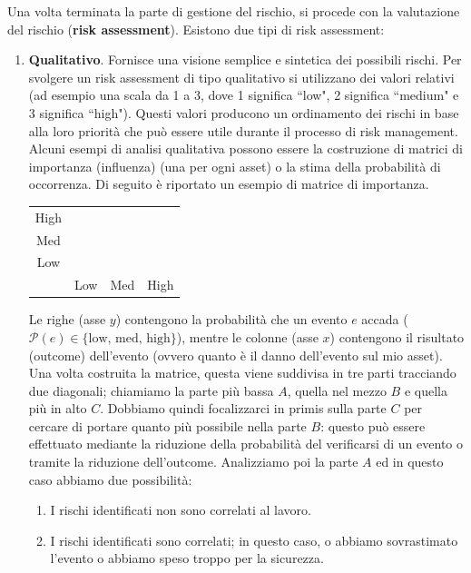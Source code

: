 Una volta terminata la parte di gestione del rischio, si procede con la valutazione del rischio (\textbf{risk assessment}). Esistono due tipi di risk assessment:
\begin{enumerate}
	\item \textbf{Qualitativo}. Fornisce una visione semplice e sintetica dei possibili rischi.
	Per svolgere un risk assessment di tipo qualitativo si utilizzano dei valori relativi (ad esempio una scala da 1 a 3, dove 1 significa \textquotedblleft low", 2 significa \textquotedblleft medium" e 3 significa \textquotedblleft high"). Questi valori producono un ordinamento dei rischi in base alla loro priorità che può essere utile durante il processo di risk management.\\
	Alcuni esempi di analisi qualitativa possono essere la costruzione di matrici di importanza (influenza) (una per ogni asset) o la stima della probabilità di occorrenza. Di seguito è riportato un esempio di matrice di importanza.
	\begin{center}
		\begin{tabular}{ c|c|c|c| }
			\cline{2-4}
			High &  &  & \\
			\cline{2-4}
			Med &  &  & \\
			\cline{2-4}
			Low &  &  & \\
			\cline{2-4}
				\multicolumn{1}{r}{} &  \multicolumn{1}{c}{Low}
			& \multicolumn{1}{c}{Med} & \multicolumn{1}{c}{High} \\
		\end{tabular}
	\end{center}
	Le righe (asse $y$) contengono la probabilità che un evento $e$ accada ($\mathcal{P}(e)\in\{\text{low, med, high}\}$), mentre le colonne (asse $x$) contengono il risultato (outcome) dell'evento (ovvero quanto è il danno dell'evento sul mio asset). Una volta costruita la matrice, questa viene suddivisa in tre parti tracciando due diagonali; chiamiamo la parte più bassa $A$, quella nel mezzo $B$ e quella più in alto $C$. Dobbiamo quindi focalizzarci in primis sulla parte $C$ per cercare di portare quanto più possibile nella parte $B$: questo può essere effettuato mediante la riduzione della probabilità del verificarsi di un evento o tramite la riduzione dell'outcome. Analizziamo poi la parte $A$ ed in questo caso abbiamo due possibilità:
	\begin{enumerate}
		\item I rischi identificati non sono correlati al lavoro.
		\item I rischi identificati sono correlati; in questo caso, o abbiamo sovrastimato l'evento o abbiamo speso troppo per la sicurezza.

\end{enumerate}
\end{enumerate}
